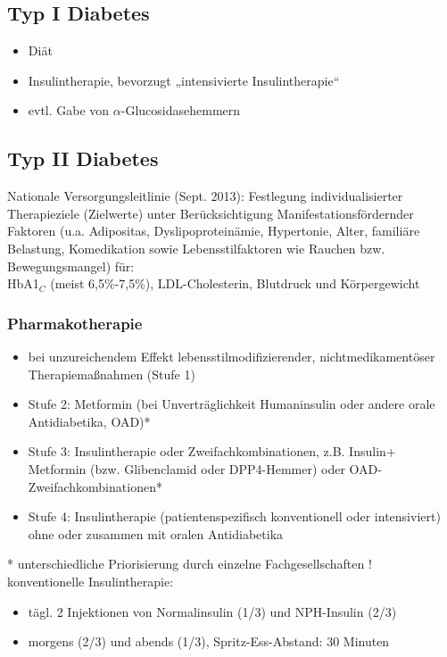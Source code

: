 \documentclass[10pt,a4paper]{report}
\begin{document}
\subsection{Typ I Diabetes} %
\label{ssub:typ_i_diabetes}
\begin{itemize}
	\item Diät
	\item Insulintherapie, bevorzugt „intensivierte Insulintherapie“
	\item evtl. Gabe von $\alpha$-Glucosidasehemmern
\end{itemize}
\subsection{Typ II Diabetes} %
\label{ssub:typ_ii_diabetes}
Nationale Versorgungsleitlinie (Sept. 2013): Festlegung individualisierter Therapieziele (Zielwerte) unter Berücksichtigung Manifestationsfördernder Faktoren (u.a. Adipositas, Dyslipoproteinämie, Hypertonie, Alter, familiäre Belastung, Komedikation sowie Lebensstilfaktoren wie Rauchen bzw. Bewegungsmangel) für:\\
HbA1$_C$ (meist 6,5\%-7,5\%), LDL-Cholesterin, Blutdruck und Körpergewicht 
\subsubsection{Pharmakotherapie} %
\label{par:pharmakotherapie}
\begin{itemize}
	\item bei unzureichendem Effekt lebensstilmodifizierender, nichtmedikamentöser Therapiemaßnahmen (Stufe 1)
	\item Stufe 2: Metformin (bei Unverträglichkeit Humaninsulin oder andere orale Antidiabetika, OAD)*
	\item Stufe 3: Insulintherapie oder Zweifachkombinationen, z.B. Insulin+ Metformin (bzw. Glibenclamid oder DPP4-Hemmer) oder OAD-Zweifachkombinationen*  
	\item Stufe 4: Insulintherapie (patientenspezifisch konventionell oder intensiviert) ohne oder zusammen mit oralen Antidiabetika
\end{itemize}
* unterschiedliche Priorisierung durch einzelne Fachgesellschaften !\\
konventionelle Insulintherapie:
\begin{itemize}
	\item tägl. 2 Injektionen von Normalinsulin (1/3) und NPH-Insulin (2/3) 
	\item morgens (2/3) und abends (1/3), Spritz-Ess-Abstand: 30 Minuten
\end{itemize}
\end{document}
